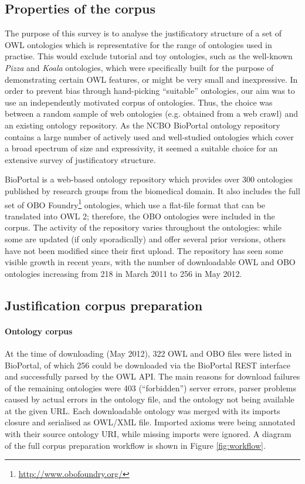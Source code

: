\subsection{Properties of the corpus}

The purpose of this survey is to analyse the justificatory structure of a set of OWL ontologies which is representative for the range of ontologies used in practise. This would exclude tutorial and toy ontologies, such as the well-known \emph{Pizza} and \emph{Koala} ontologies, which were specifically built for the purpose of demonstrating certain OWL features, or might be very small and inexpressive. In order to prevent bias through hand-picking \enquote{suitable} ontologies, our aim was to use an independently motivated corpus of ontologies. Thus, the choice was between a random sample of web ontologies (e.g. obtained from a web crawl) and an existing ontology repository. As the NCBO BioPortal ontology repository contains a large number of actively used and well-studied ontologies which cover a broad spectrum of size and expressivity, it seemed a suitable choice for an extensive survey of justificatory structure. 

BioPortal is a web-based ontology repository which provides over 300 ontologies published by research groups from the biomedical domain. It also includes the full set of OBO Foundry\footnote{\url{http://www.obofoundry.org/}} ontologies, which use a flat-file format that can be translated into OWL 2; therefore, the OBO ontologies were included in the corpus. The activity of the repository varies throughout the ontologies: while some are updated (if only sporadically) and offer several prior versions, others have not been modified since their first upload. The repository has seen some visible growth in recent years, with the number of downloadable OWL and OBO ontologies increasing from 218 in March 2011 \cite{bail11jm} to 256 in May 2012.


\subsection{Justification corpus preparation}


\paragraph{Ontology corpus}

At the time of downloading (May 2012), 322 OWL and OBO files were listed in BioPortal, of which 256 could be downloaded via the BioPortal REST interface and successfully parsed by the OWL API. The main reasons for download failures of the remaining ontologies were 403 (\enquote{forbidden}) server errors, parser problems caused by actual errors in the ontology file, and the ontology not being available at the given URL. Each downloadable ontology was merged with its imports closure and serialised as OWL/XML file. Imported axioms were being annotated with their source ontology URI, while missing imports were ignored. A diagram of the full corpus preparation workflow is shown in Figure \ref{fig:workflow}.

